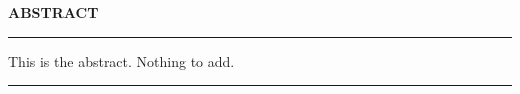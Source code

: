 \clearpage\mbox{}\clearpage
\begin{center}
\LARGE \textbf{ABSTRACT}
\end{center}
\hrule
\vspace{10pt}
This is the abstract. Nothing to add. 
\vspace{10pt}
\hrule